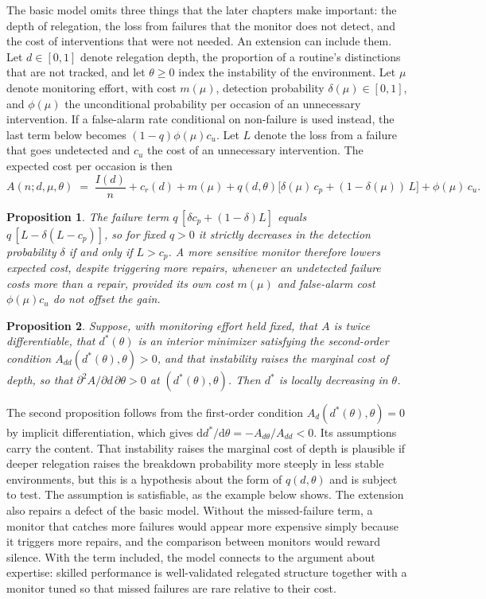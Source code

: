 \documentclass[11pt]{report}
\newtheorem{proposition}{Proposition}[chapter]
\theoremstyle{remark}
\theoremstyle{definition}
\begin{document}
The basic model omits three things that the later chapters make important: the depth of relegation, the loss from failures that the monitor does not detect, and the cost of interventions that were not needed. An extension can include them. Let $d\in[0,1]$ denote relegation depth, the proportion of a routine's distinctions that are not tracked, and let $\theta\ge 0$ index the instability of the environment. Let $\mu$ denote monitoring effort, with cost $m(\mu)$, detection probability $\delta(\mu)\in[0,1]$, and $\phi(\mu)$ the unconditional probability per occasion of an unnecessary intervention. If a false-alarm rate conditional on non-failure is used instead, the last term below becomes $(1-q)\phi(\mu)c_u$. Let $L$ denote the loss from a failure that goes undetected and $c_u$ the cost of an unnecessary intervention. The expected cost per occasion is then
\[
A(n;d,\mu,\theta) \;=\; \frac{I(d)}{n} + c_r(d) + m(\mu) + q(d,\theta)\bigl[\delta(\mu)\,c_p + (1-\delta(\mu))\,L\bigr] + \phi(\mu)\,c_u .
\]

\begin{proposition}
The failure term $q\,[\delta c_p + (1-\delta)L]$ equals $q\,[L - \delta(L-c_p)]$, so for fixed $q>0$ it strictly decreases in the detection probability $\delta$ if and only if $L>c_p$. A more sensitive monitor therefore lowers expected cost, despite triggering more repairs, whenever an undetected failure costs more than a repair, provided its own cost $m(\mu)$ and false-alarm cost $\phi(\mu)c_u$ do not offset the gain.
\end{proposition}

\begin{proposition}
Suppose, with monitoring effort held fixed, that $A$ is twice differentiable, that $d^*(\theta)$ is an interior minimizer satisfying the second-order condition $A_{dd}(d^*(\theta),\theta)>0$, and that instability raises the marginal cost of depth, so that $\partial^2 A/\partial d\,\partial\theta>0$ at $(d^*(\theta),\theta)$. Then $d^*$ is locally decreasing in $\theta$.
\end{proposition}

\noindent The second proposition follows from the first-order condition $A_d(d^*(\theta),\theta)=0$ by implicit differentiation, which gives $\mathrm{d}d^*/\mathrm{d}\theta=-A_{d\theta}/A_{dd}<0$. Its assumptions carry the content. That instability raises the marginal cost of depth is plausible if deeper relegation raises the breakdown probability more steeply in less stable environments, but this is a hypothesis about the form of $q(d,\theta)$ and is subject to test. The assumption is satisfiable, as the example below shows. The extension also repairs a defect of the basic model. Without the missed-failure term, a monitor that catches more failures would appear more expensive simply because it triggers more repairs, and the comparison between monitors would reward silence. With the term included, the model connects to the argument about expertise: skilled performance is well-validated relegated structure together with a monitor tuned so that missed failures are rare relative to their cost.
\end{document}
